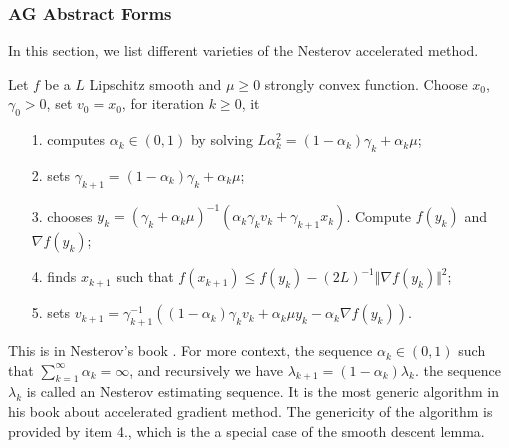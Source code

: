 \documentclass[12pt]{article}
\begin{document}
        \subsubsection{AG Abstract Forms}
            In this section, we list different varieties of the Nesterov accelerated method. 
            \begin{definition}[Nestrov 2.2.7]\label{def:Nes2.2.7}
                Let $f$ be a $L$ Lipschitz smooth and $\mu\ge 0$ strongly convex function. 
                Choose $x_0$, $\gamma_0 > 0$, set $v_0 = x_0$, for iteration $k\ge 0$, it
                \begin{enumerate}
                    \item[1.] computes $\alpha_k \in (0, 1)$ by solving $L\alpha_k^2 = (1 - \alpha_k)\gamma_k + \alpha_k \mu$; 
                    \item[2.] sets $\gamma_{k + 1} = (1 - \alpha_k)\gamma_k + \alpha_k \mu$;
                    \item[3.] chooses $y_k = (\gamma_k + \alpha_k \mu)^{-1}(\alpha_k \gamma_k v_k + \gamma_{k + 1}x_k)$. Compute $f(y_k)$ and $\nabla f(y_k)$; 
                    \item[4.] finds $x_{k + 1}$ such that $f(x_{k + 1}) \le f(y_k) - (2L)^{-1} \Vert \nabla f(y_k)\Vert^2$; 
                    \item[5.] sets $v_{k + 1} = \gamma_{k+1}^{-1}((1 - \alpha_k)\gamma_kv_k + \alpha_k \mu y_k - \alpha_k \nabla f(y_k))$. 
                \end{enumerate}
            \end{definition}
            \begin{remark}
                This is in Nesterov's book \cite[(2.2.7)]{nesterov_lectures_2018}. 
                For more context, the sequence $\alpha_k \in (0, 1)$ such that $\sum_{k = 1}^{\infty}\alpha_k = \infty$, and recursively we have $\lambda_{k + 1} = (1 - \alpha_k)\lambda_k$. 
                the sequence $\lambda_k$ is called an Nesterov estimating sequence. 
                It is the most generic algorithm in his book about accelerated gradient method. 
                The genericity of the algorithm is provided by item 4., which is the a special case of the smooth descent lemma. 

            \end{remark}
\end{document}
